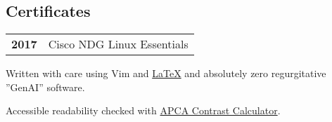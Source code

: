 \documentclass[lighthipster]{simplehipstercv}
\newlength{\rightcolwidth}
\begin{document}
\begin{paracol}{2}
\section*{Certificates}
\begin{tabular}{>{\footnotesize\bfseries}r >{\footnotesize}p{}}
    2017 & Cisco NDG Linux Essentials
\end{tabular}
\bigskip




\vfill{} %
\vspace{4em}
\setlength{\parindent}{0pt}
\begin{minipage}[t]{\rightcolwidth}
\vfill
\begin{center}\fontfamily{\sfdefault}\selectfont \color{black!90}
{
  \small
  Written with care using Vim and \href{https://github.com/izcet/latex-resume}{\LaTeX{}} and absolutely zero regurgitative ''GenAI'' software.
  
  Accessible readability checked with \href{http://www.myndex.com/APCA/}{APCA Contrast Calculator}.
}
\end{center}
\end{minipage}

\vspace{48em}
\end{paracol}
\end{document}
